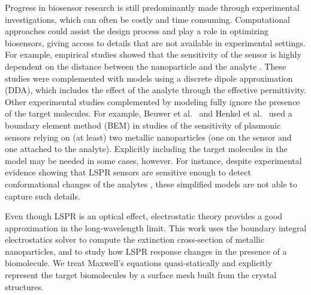    
Progress in biosensor research is still predominantly made
through experimental investigations, which can often be costly and time consuming.
Computational approaches could assist the design process and play a role  
in optimizing biosensors, giving access to details that are not available in experimental settings.
For example, empirical studies showed that the sensitivity of the sensor
is highly dependent on the distance between the nanoparticle and the analyte \cite{HaesETal2004}.
These studies were complemented with models using a discrete dipole approximation (DDA),
which includes the effect of the analyte through the effective permittivity. 
Other experimental studies complemented by modeling fully ignore the presence of the target molecules.
For example, Beuwer et al.~\cite{BeuwervanHoofZijlstra2018} and Henkel et al.~\cite{HenkelETal2018} 
used a boundary element method (BEM) in studies of the sensitivity of plasmonic sensors 
relying on (at least) two metallic nanoparticles (one on the sensor and one attached to the analyte).
Explicitly including the target molecules in the model may be needed in some cases, however.
For instance, despite experimental evidence showing that LSPR sensors are sensitive enough to detect 
conformational changes of the analytes \cite{HallETal2011}, 
these simplified models are not able to capture such details.


Even though LSPR is an optical effect, electrostatic theory
provides a good approximation in the long-wavelength limit. This work uses
the boundary integral electrostatics solver \pygbe \cite{CooperETal2016} 
to compute the extinction cross-section of metallic nanoparticles, and to study how LSPR 
response changes in the presence of a biomolecule. 
We treat Maxwell's equations quasi-statically \cite{MayergoyzZhang2007} and
explicitly represent the target biomolecules by a surface mesh built from the crystal structures. 

